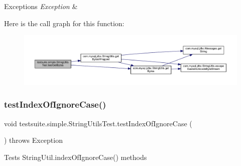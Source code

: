\begin{DoxyExceptions}{Exceptions}
{\em Exception} & \\
\hline
\end{DoxyExceptions}
Here is the call graph for this function\+:
\nopagebreak
\begin{figure}[H]
\begin{center}
\leavevmode
\includegraphics[width=350pt]{classtestsuite_1_1simple_1_1_string_utils_test_abbf535f829fabba1d7d3c205c37e092e_cgraph}
\end{center}
\end{figure}
\mbox{\label{classtestsuite_1_1simple_1_1_string_utils_test_a8de93983177d6655b04484cf8391f653}} 
\subsubsection{\texorpdfstring{test\+Index\+Of\+Ignore\+Case()}{testIndexOfIgnoreCase()}}
{\footnotesize\ttfamily void testsuite.\+simple.\+String\+Utils\+Test.\+test\+Index\+Of\+Ignore\+Case (\begin{DoxyParamCaption}{ }\end{DoxyParamCaption}) throws Exception}

Tests String\+Util.\+index\+Of\+Ignore\+Case() methods


